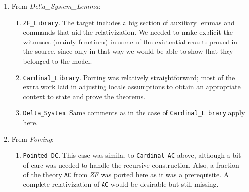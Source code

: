 \documentclass[11pt,a4paper,english]{article}
\newcommand{\session}[1]{\textit{#1}}
\newcommand{\theory}[1]{\texttt{#1}}
\begin{document}
\begin{enumerate}
\begin{enumerate}
  \end{enumerate}
\item From \session{Delta\_System\_Lemma}:
  \begin{enumerate}
  \item \theory{ZF\_Library}. The target includes a big section of
    auxiliary lemmas and commands that aid the relativization. We
    needed to make explicit the witnesses (mainly functions) in some of the
    existential results proved in the source, since only in that way
    we would be able to show that they belonged to the model.
  \item \theory{Cardinal\_Library}. Porting was relatively
    straightforward; most of the extra work laid in adjusting locale
    assumptions to obtain an appropriate context to state and prove
    the theorems.
  \item \theory{Delta\_System}. Same comments as in the case of
    \theory{Cardinal\_Library} apply here.
  \end{enumerate}
\item From \session{Forcing}:
  \begin{enumerate}
  \item \theory{Pointed\_DC}. This case was similar to
    \theory{Cardinal\_AC} above, although a bit of care was needed to
    handle the recursive construction. Also, a fraction of the theory
    \theory{AC} from \session{ZF} was ported here as it was a
    prerequisite. A complete relativization of \theory{AC} would be
    desirable but still missing.
  \end{enumerate}
\end{enumerate}





\end{document}
